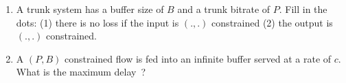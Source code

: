 \begin{problem}
\begin{enumerate}
We say that a flow is $(P, B)$ constrained if it has
$\gamma_{P,B}$ as an arrival curve.
        \item  A trunk system has a buffer size of $B$ and a trunk bitrate of $P$.
Fill in the dots: (1) there is no loss if the input is $(., .)$
constrained (2) the output is $(.,.)$ constrained.

        \item  A $(P, B)$ constrained flow is fed into an infinite buffer served at a
        rate of $c$. What is the maximum delay~?
\end{enumerate}

\end{problem}
